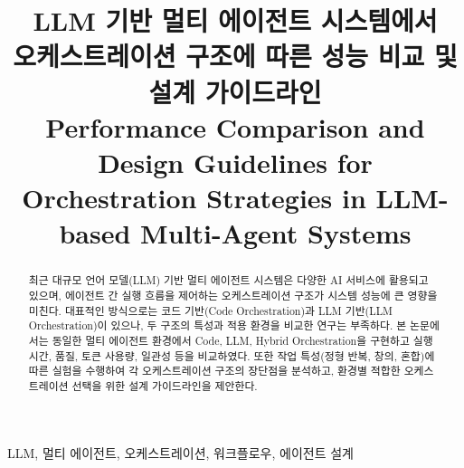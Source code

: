 \documentclass[conference]{IEEEtran}
\begin{document}
\title{LLM 기반 멀티 에이전트 시스템에서\\
오케스트레이션 구조에 따른 성능 비교 및 설계 가이드라인\\
\large Performance Comparison and Design Guidelines for\\
Orchestration Strategies in LLM-based Multi-Agent Systems}

\author{
}

\maketitle

\begin{abstract}
최근 대규모 언어 모델(LLM) 기반 멀티 에이전트 시스템은 다양한 AI 서비스에
활용되고 있으며, 에이전트 간 실행 흐름을 제어하는 오케스트레이션 구조가
시스템 성능에 큰 영향을 미친다. 대표적인 방식으로는 코드 기반(Code
Orchestration)과 LLM 기반(LLM Orchestration)이 있으나, 두 구조의 특성과
적용 환경을 비교한 연구는 부족하다. 본 논문에서는 동일한 멀티 에이전트
환경에서 Code, LLM, Hybrid Orchestration을 구현하고 실행 시간, 품질,
토큰 사용량, 일관성 등을 비교하였다. 또한 작업 특성(정형 반복, 창의,
혼합)에 따른 실험을 수행하여 각 오케스트레이션 구조의 장단점을 분석하고,
환경별 적합한 오케스트레이션 선택을 위한 설계 가이드라인을 제안한다.
\end{abstract}

\begin{IEEEkeywords}
LLM, 멀티 에이전트, 오케스트레이션, 워크플로우, 에이전트 설계
\end{IEEEkeywords}










\end{document}
